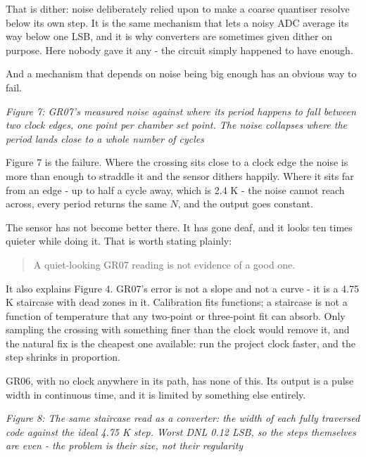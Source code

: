 That is dither: noise deliberately relied upon to make a coarse
quantiser resolve below its own step. It is the same mechanism that lets
a noisy ADC average its way below one LSB, and it is why converters are
sometimes given dither on purpose. Here nobody gave it any - the circuit
simply happened to have enough.

And a mechanism that depends on noise being big enough has an obvious
way to fail.


{
\centering
{}
}

\emph{Figure 7: GR07's measured noise against where its period happens
to fall between two clock edges, one point per chamber set point. The
noise collapses where the period lands close to a whole number of
cycles}

Figure 7 is the failure. Where the crossing sits close to a clock edge
the noise is more than enough to straddle it and the sensor dithers
happily. Where it sits far from an edge - up to half a cycle away, which
is 2.4 K - the noise cannot reach across, every period returns the same
\(N\), and the output goes constant.

The sensor has not become better there. It has gone deaf, and it looks
ten times quieter while doing it. That is worth stating plainly:

\begin{quote}
A quiet-looking GR07 reading is not evidence of a good one.
\end{quote}

It also explains Figure 4. GR07's error is not a slope and not a curve -
it is a 4.75 K staircase with dead zones in it. Calibration fits
functions; a staircase is not a function of temperature that any
two-point or three-point fit can absorb. Only sampling the crossing with
something finer than the clock would remove it, and the natural fix is
the cheapest one available: run the project clock faster, and the step
shrinks in proportion.

GR06, with no clock anywhere in its path, has none of this. Its output
is a pulse width in continuous time, and it is limited by something else
entirely.


{
\centering
{}
}

\emph{Figure 8: The same staircase read as a converter: the width of
each fully traversed code against the ideal 4.75 K step. Worst DNL 0.12
LSB, so the steps themselves are even - the problem is their size, not
their regularity}

